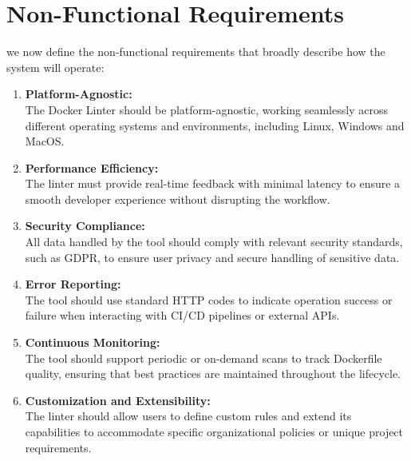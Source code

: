\section{Non-Functional Requirements}
we now define the non-functional requirements that broadly describe how the system will operate:
\begin{enumerate}
    \item \textbf{Platform-Agnostic:}\\The Docker Linter should be platform-agnostic, working seamlessly across different operating systems and environments, including Linux, Windows and MacOS.
    \item \textbf{Performance Efficiency:}\\The linter must provide real-time feedback with minimal latency to ensure a smooth developer experience without disrupting the workflow.
    \item \textbf{Security Compliance:}\\All data handled by the tool should comply with relevant security standards, such as GDPR, to ensure user privacy and secure handling of sensitive data.
    \item \textbf{Error Reporting:}\\The tool should use standard HTTP codes to indicate operation success or failure when interacting with CI/CD pipelines or external APIs.
    \item \textbf{Continuous Monitoring:}\\The tool should support periodic or on-demand scans to track Dockerfile quality, ensuring that best practices are maintained throughout the lifecycle.
    \item \textbf{Customization and Extensibility:}\\The linter should allow users to define custom rules and extend its capabilities to accommodate specific organizational policies or unique project requirements.
\end{enumerate}

